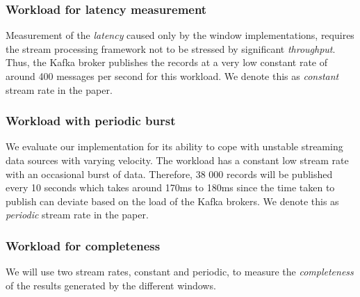 \subsubsection{Workload for latency measurement}
Measurement of the \emph{latency} caused only 
by the window implementations, requires the stream processing framework not to be 
stressed by significant \emph{throughput}. Thus, the Kafka broker 
publishes the records at a very low constant rate of around 400 messages per second for 
this workload.
We denote this as \emph{constant} stream rate in the paper. 

\subsubsection{Workload with periodic burst}
We evaluate our implementation for its ability to cope with unstable 
streaming data sources with varying velocity.
The workload has a constant low stream rate with an occasional 
burst of data. Therefore, 38 000 records will be published every 10 seconds which 
takes around 170ms to 180ms since the time taken to publish can deviate based on the 
load of the Kafka brokers.
We denote this as \emph{periodic} stream rate in the paper. 

\subsubsection{Workload for completeness}
We will use two stream rates, constant and periodic, 
to measure the \emph{completeness} of the results generated 
by the different windows.






